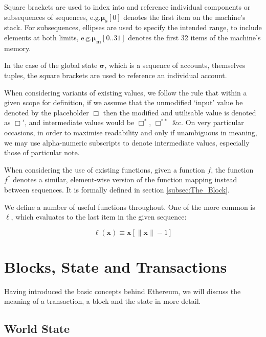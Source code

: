 \documentclass[9pt,oneside]{amsart}
\makeatletter
\newcommand{\linkdest}[1]{\Hy@raisedlink{\hypertarget{#1}{}}}
\newcommand*\eg{e.g.\@\xspace}
\makeatother
\begin{document}
\begin{multicols}{2}
Square brackets are used to index into and reference individual components or subsequences of sequences, \eg $\boldsymbol{\mu}_{\mathbf{s}}[0]$ denotes the first item on the machine's stack. For subsequences, ellipses are used to specify the intended range, to include elements at both limits, \eg $\boldsymbol{\mu}_{\mathbf{m}}[0..31]$ denotes the first 32 items of the machine's memory.

In the case of the global state $\boldsymbol{\sigma}$, which is a sequence of accounts, themselves tuples, the square brackets are used to reference an individual account.

When considering variants of existing values, we follow the rule that within a given scope for definition, if we assume that the unmodified `input' value be denoted by the placeholder $\Box$ then the modified and utilisable value is denoted as $\Box'$, and intermediate values would be $\Box^*$,  $\Box^{**}$ \&c. On very particular occasions, in order to maximise readability and only if unambiguous in meaning, we may use alpha-numeric subscripts to denote intermediate values, especially those of particular note.

When considering the use of existing functions, given a function $f$, the function \hyperlink{general_element_wise_sequence_transformation_f_pow_asterisk}{$f^*$} denotes a similar, element-wise version of the function mapping instead between sequences. It is formally defined in section \hyperlink{block}{\ref{subsec:The_Block}}.

We define a number of useful functions throughout. \linkdest{ell}One of the more common is $\ell$, which evaluates to the last item in the given sequence:

\begin{equation}
\ell(\mathbf{x}) \equiv \mathbf{x}[\lVert \mathbf{x} \rVert - 1]
\end{equation}

\section{Blocks, State and Transactions} \label{ch:bst}

Having introduced the basic concepts behind Ethereum, we will discuss the meaning of a transaction, a block and the state in more detail.

\subsection{World State} \label{ch:state}


\end{multicols}
\end{document}
